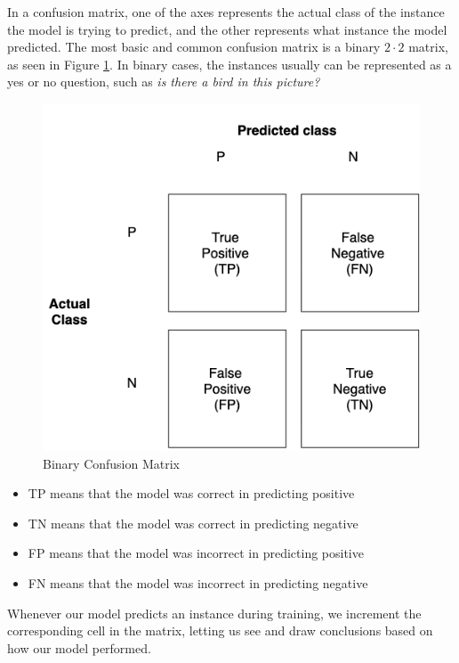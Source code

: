 \documentclass[nofilelist]{cslthse-msc}
\begin{document}
In a confusion matrix, one of the axes represents the actual class of the instance the model is trying to predict, and the other represents what instance the model predicted. The most basic and common confusion matrix is a binary $2 \cdot 2$ matrix, as seen in Figure \ref{fig:confusion}. In binary cases, the instances usually can be represented as a yes or no question, such as \textit{is there a bird in this picture?}

\begin{figure}[h!]
    \centering
    \hbox{\hspace{6em}\includegraphics[width=\textwidth/2]{msccls/explanatory_images/confusion_matrix.png}}
    \caption{Binary Confusion Matrix}
    \label{fig:confusion}
\end{figure}

\begin{itemize}
    \item TP means that the model was correct in predicting positive
    \item TN means that the model was correct in predicting negative
    \item FP means that the model was incorrect in predicting positive
    \item FN means that the model was incorrect in predicting negative
\end{itemize}

Whenever our model predicts an instance during training, we increment the corresponding cell in the matrix, letting us see and draw conclusions based on how our model performed. 
\end{document}
